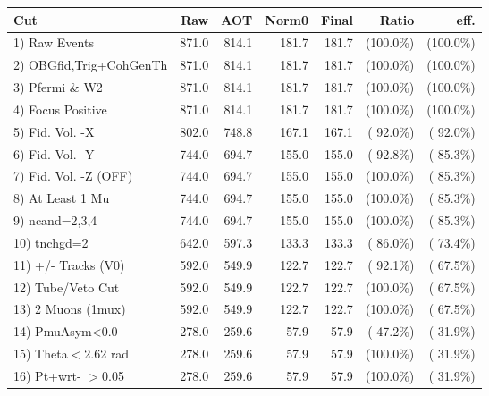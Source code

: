  \begin{table}[h!]\centering
 \begin{tabular}{||l||r|r|r|r|r|r||}
 \hline
 \hline
 Cut & Raw & AOT & Norm0 & Final & Ratio & eff.       \\
 \hline
  1) Raw Events           &        871.0 &        814.1 &        181.7 &        181.7 & (100.0\%) & (100.0\%) \\
  2) OBGfid,Trig+CohGenTh &        871.0 &        814.1 &        181.7 &        181.7 & (100.0\%) & (100.0\%) \\
  3) Pfermi \& W2         &        871.0 &        814.1 &        181.7 &        181.7 & (100.0\%) & (100.0\%) \\
  4) Focus Positive       &        871.0 &        814.1 &        181.7 &        181.7 & (100.0\%) & (100.0\%) \\
  5) Fid. Vol. -X         &        802.0 &        748.8 &        167.1 &        167.1 & ( 92.0\%) & ( 92.0\%) \\
  6) Fid. Vol. -Y         &        744.0 &        694.7 &        155.0 &        155.0 & ( 92.8\%) & ( 85.3\%) \\
  7) Fid. Vol. -Z (OFF)   &        744.0 &        694.7 &        155.0 &        155.0 & (100.0\%) & ( 85.3\%) \\
  8) At Least 1 Mu        &        744.0 &        694.7 &        155.0 &        155.0 & (100.0\%) & ( 85.3\%) \\
  9) ncand=2,3,4          &        744.0 &        694.7 &        155.0 &        155.0 & (100.0\%) & ( 85.3\%) \\
 10) tnchgd=2             &        642.0 &        597.3 &        133.3 &        133.3 & ( 86.0\%) & ( 73.4\%) \\
 11) +/- Tracks (V0)      &        592.0 &        549.9 &        122.7 &        122.7 & ( 92.1\%) & ( 67.5\%) \\
 12) Tube/Veto Cut        &        592.0 &        549.9 &        122.7 &        122.7 & (100.0\%) & ( 67.5\%) \\
 13) 2 Muons (1mux)       &        592.0 &        549.9 &        122.7 &        122.7 & (100.0\%) & ( 67.5\%) \\
 14) PmuAsym<0.0          &        278.0 &        259.6 &         57.9 &         57.9 & ( 47.2\%) & ( 31.9\%) \\
 15) Theta$<$2.62 rad     &        278.0 &        259.6 &         57.9 &         57.9 & (100.0\%) & ( 31.9\%) \\
 16) Pt+wrt- $>$0.05      &        278.0 &        259.6 &         57.9 &         57.9 & (100.0\%) & ( 31.9\%) \\

\end{tabular}
\end{table}
